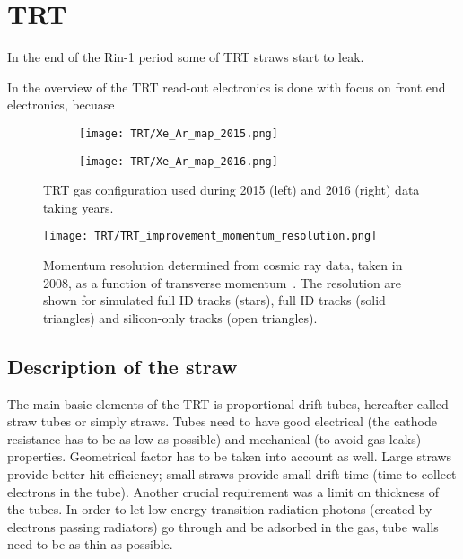 \chapter{TRT}
\label{chap:TRT}

In the end of the Rin-1 period some of TRT straws start to leak.


In the  overview of the TRT read-out electronics is done with focus on front end electronics, becuase 


\begin{figure}
\centering
\begin{subfigure}{.5\textwidth}
  \centering
  \texttt{[image: TRT/Xe\_Ar\_map\_2015.png]}
  \label{fig:sub1}
\end{subfigure}%
\begin{subfigure}{.5\textwidth}
  \centering
  \texttt{[image: TRT/Xe\_Ar\_map\_2016.png]}
  \label{fig:sub2}
\end{subfigure}
\caption{TRT gas configuration used during 2015 (left) and 2016 (right) data taking years.}
\label{fig:gas_gain}
\end{figure}


\begin{figure}
\centering
\texttt{[image: TRT/TRT\_improvement\_momentum\_resolution.png]}
\caption{ 
Momentum resolution determined from cosmic ray data, taken in 2008, as a function of transverse momentum~\cite{Aad:2010bx}.
The resolution are shown for simulated full ID tracks (stars), full ID tracks (solid triangles) and silicon-only tracks (open triangles).
}
\label{fig:gas_gain}
\end{figure}





\section{Description of the straw}

The main basic elements of the TRT is proportional drift tubes, hereafter called straw tubes or simply straws.
Tubes need to have good electrical (the cathode resistance has to be as low as possible) and mechanical (to avoid gas leaks) properties.
Geometrical factor has to be taken into account as well. Large straws provide better hit efficiency; small straws provide small drift time (time to collect electrons in the tube).
Another crucial requirement was a limit on thickness of the tubes. 
In order to let low-energy transition radiation photons (created by electrons passing radiators) go through and be adsorbed in the gas, tube walls need to be as thin as possible.

